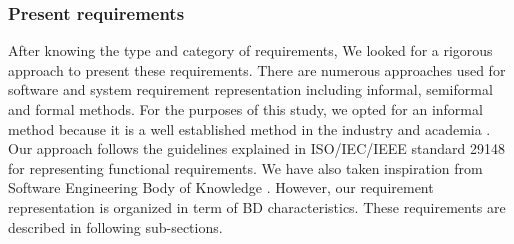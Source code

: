\documentclass{bmcart}
\begin{document}
\subsubsection{Present requirements}
After knowing the type and category of requirements, We looked for a rigorous approach to present these requirements. There are numerous approaches used for software and system requirement representation including informal, semiformal and formal methods. For the purposes of this study, we opted for an informal method because it is a well established method in the industry and academia \cite{kassab2014state}. Our approach follows the guidelines explained in ISO/IEC/IEEE standard 29148 \cite{ISO29148} for representing functional requirements. We have also taken inspiration from Software Engineering Body of Knowledge \cite{abran2004software}. However, our requirement representation is organized in term of BD characteristics. These requirements are described in following sub-sections.





        


\end{document}
